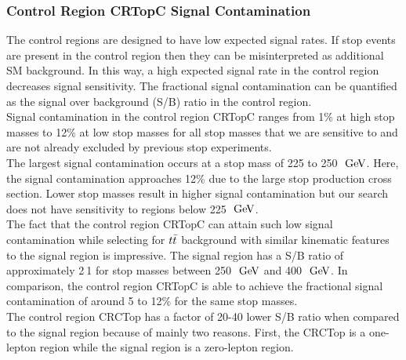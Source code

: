 \subsubsection{Control Region CRTopC Signal Contamination}

\indent The control regions are designed to have low expected signal rates.  If stop events are present in the control region then they can be misinterpreted as additional SM background.  In this way, a high expected signal rate in the control region decreases signal sensitivity.  The fractional signal contamination can be quantified as the signal over background (S/B) ratio in the control region. \\%

\indent Signal contamination in the control region CRTopC ranges from 1\% at high stop masses to 12\% at low stop masses for all stop masses that we are sensitive to and are not already excluded by previous stop experiments. \\%

\indent The largest signal contamination occurs at a stop mass of 225 to 250 $\gev$.   Here, the signal contamination approaches 12\% due to the large stop production cross section.  Lower stop masses result in higher signal contamination but our search does not have sensitivity to regions below 225 $\gev$.  \\

\indent The fact that the control region CRTopC can attain such low signal contamination while selecting for $t\bar{t}$ background with similar kinematic features to the signal region is impressive.  The signal region has a S/B ratio of approximately 2$\:$1 for stop masses between 250 $\gev$ and 400 $\gev$.   In comparison, the control region CRTopC is able to achieve the fractional signal contamination of around 5 to 12\% for the same stop masses.  \\

\indent The control region CRCTop has a factor of 20-40 lower S/B ratio when compared to the signal region because of mainly two reasons.  First, the CRCTop is a one-lepton region while the signal region is a zero-lepton region. \\

